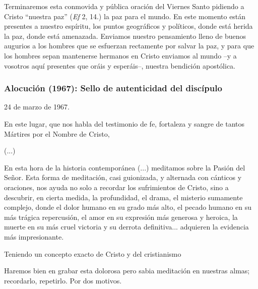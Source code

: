			\begin{body}Terminaremos esta conmovida y pública oración del Viernes Santo pidiendo a Cristo “nuestra paz” (\textit{Ef} 2, 14.) la paz para el mundo. En este momento están presentes a nuestro espíritu, los puntos geográficos y políticos, donde está herida la paz, donde está amenazada. Enviamos nuestro pensamiento lleno de buenos augurios a los hombres que se esfuerzan rectamente por salvar la paz, y para que los hombres sepan mantenerse hermanos en Cristo enviamos al mundo –y a vosotros aquí presentes que oráis y esperáis–, nuestra bendición apostólica.\end{body}
			
			\subsubsection{Alocución (1967): Sello de autenticidad del discípulo}
			
			\begin{referencia}24 de marzo de 1967. \end{referencia}
			
			\begin{body}En este lugar, que nos habla del testimonio de fe, fortaleza y sangre de tantos Mártires por el Nombre de Cristo, \begin{bodysmall} (...)\end{bodysmall} En esta hora de la historia contemporánea (...) meditamos sobre la Pasión del Señor. Esta forma de meditación, casi guionizada, y alternada con cánticos y oraciones, nos ayuda no solo a recordar los sufrimientos de Cristo, sino a descubrir, en cierta medida, la profundidad, el drama, el misterio sumamente complejo, donde el dolor humano en su grado más alto, el pecado humano en su más trágica repercusión, el amor en su expresión más generosa y heroica, la muerte en su más cruel victoria y su derrota definitiva... adquieren la evidencia más impresionante. \end{body}
			
			\begin{centerbold}Teniendo un concepto exacto de Cristo y del cristianismo \end{centerbold}
			
			\begin{body}Haremos bien en grabar esta dolorosa pero sabia meditación en nuestras almas; recordarlo, repetirlo. Por dos motivos. \end{body}
			
